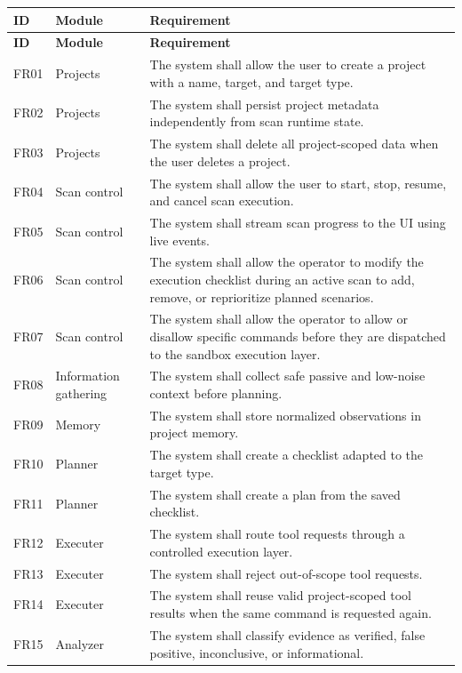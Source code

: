 \documentclass[12pt,a4paper]{report}
\begin{document}
\begin{longtable}{|p{}|p{}|p{}|}
\hline
\textbf{ID} & \textbf{Module} & \textbf{Requirement} \\
\hline
\endfirsthead
\hline
\textbf{ID} & \textbf{Module} & \textbf{Requirement} \\
\hline
\endhead
FR01 & Projects & The system shall allow the user to create a project with a
name, target, and target type. \\
\hline
FR02 & Projects & The system shall persist project metadata independently from
scan runtime state. \\
\hline
FR03 & Projects & The system shall delete all project-scoped data when the
user deletes a project. \\
\hline
FR04 & Scan control & The system shall allow the user to start, stop, resume,
and cancel scan execution. \\
\hline
FR05 & Scan control & The system shall stream scan progress to the UI using
live events. \\
\hline
FR06 & Scan control & The system shall allow the operator to modify the
execution checklist during an active scan to add, remove, or reprioritize
planned scenarios. \\
\hline
FR07 & Scan control & The system shall allow the operator to allow or disallow
specific commands before they are dispatched to the sandbox execution layer. \\
\hline
FR08 & Information gathering & The system shall collect safe passive and
low-noise context before planning. \\
\hline
FR09 & Memory & The system shall store normalized observations in project
memory. \\
\hline
FR10 & Planner & The system shall create a checklist adapted to the target
type. \\
\hline
FR11 & Planner & The system shall create a plan from the saved checklist. \\
\hline
FR12 & Executer & The system shall route tool requests through a controlled
execution layer. \\
\hline
FR13 & Executer & The system shall reject out-of-scope tool requests. \\
\hline
FR14 & Executer & The system shall reuse valid project-scoped tool results
when the same command is requested again. \\
\hline
FR15 & Analyzer & The system shall classify evidence as verified, false
positive, inconclusive, or informational. \\

\end{longtable}
\end{document}
